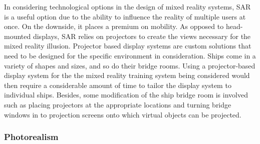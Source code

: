 In considering technological options in the design of mixed reality systems, SAR is a useful option due to the ability to influence the reality of multiple users at once. On the downside, it places a premium on mobility. As opposed to head-mounted displays, SAR relies on projectors to create the views necessary for the mixed reality illusion. Projector based display systems are custom solutions that need to be designed for the specific environment in consideration. Ships come in a variety of shapes and sizes, and so do their bridge rooms. Using a projector-based display system for the the mixed reality training system being considered would then require a considerable amount of time to tailor the display system to individual ships. Besides, some modification of the ship bridge room is involved such as placing projectors at the appropriate locations and turning bridge windows in to projection screens onto which virtual objects can be projected.

\subsubsection{Photorealism}

